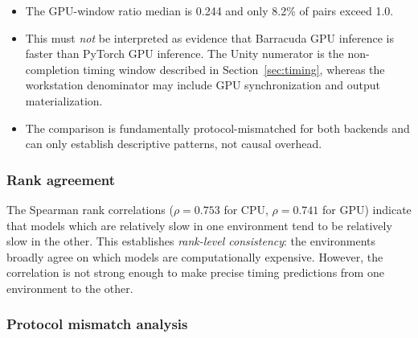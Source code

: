 \documentclass[10pt,twocolumn]{article}
\begin{document}
\begin{itemize}[nosep,leftmargin=*]
  \item The GPU-window ratio median is 0.244 and only 8.2\% of pairs exceed 1.0.
  \item This must \emph{not} be interpreted as evidence that Barracuda GPU inference is faster than PyTorch GPU inference. The Unity numerator is the non-completion timing window described in Section~\ref{sec:timing}, whereas the workstation denominator may include GPU synchronization and output materialization.
  \item The comparison is fundamentally protocol-mismatched for both backends and can only establish descriptive patterns, not causal overhead.
\end{itemize}

\subsubsection{Rank agreement}

The Spearman rank correlations ($\rho = 0.753$ for CPU, $\rho = 0.741$ for GPU) indicate that models which are relatively slow in one environment tend to be relatively slow in the other. This establishes \emph{rank-level consistency}: the environments broadly agree on which models are computationally expensive. However, the correlation is not strong enough to make precise timing predictions from one environment to the other.

\subsubsection{Protocol mismatch analysis}
\end{document}
